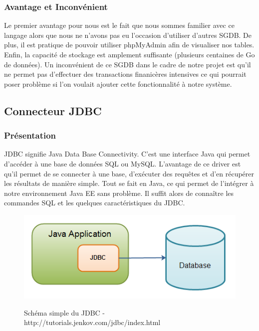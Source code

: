 \subsubsection{Avantage et Inconvénient}
Le premier avantage pour nous est le fait que nous sommes familier avec ce langage alors que nous ne n'avons pas eu l'occasion d'utiliser d'autres SGDB.
De plus, il est pratique de pouvoir utiliser phpMyAdmin afin de visualiser nos tables. Enfin, la capacité de stockage est amplement suffisante (plusieurs centaines de Go de données).
Un inconvénient de ce SGDB dans le cadre de notre projet est qu'il ne permet pas d'effectuer des transactions finanicères intensives ce qui pourrait poser problème si l'on voulait ajouter cette fonctionnalité à notre système.

\subsection{Connecteur JDBC}

\subsubsection{Présentation}
JDBC signifie Java Data Base Connectivity. C'est une interface Java qui permet d'accéder à une base de données SQL ou MySQL. L'avantage de ce driver est qu'il permet de se connecter à une base, d'exécuter des requêtes et d'en récupérer les résultats de manière simple. Tout se fait en Java, ce qui permet de l'intégrer à notre environnement Java EE sans problème. Il suffit alors de connaître les commandes SQL et les quelques caractéristiques du JDBC.\\

\begin{figure}[H]
  \center
  \includegraphics[scale=0.7]{../graph/jdbc.png} \\
  \caption{Schéma simple du JDBC - http://tutorials.jenkov.com/jdbc/index.html}
\end{figure}


